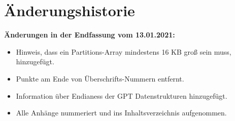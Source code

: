 \section{Änderungshistorie}

\textbf{Änderungen in der Endfassung vom 13.01.2021:}

\begin{itemize}
    \item Hinweis, dass ein Partitions-Array mindestens 16 KB groß sein muss, hinzugefügt.

    \item Punkte am Ende von Überschrifts-Nummern entfernt.

    \item Information über Endianess der GPT Datenstrukturen hinzugefügt.
    
    \item Alle Anhänge nummeriert und ins Inhaltsverzeichnis aufgenommen.
\end{itemize}
